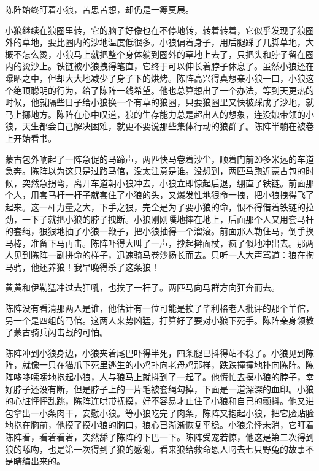 \par 陈阵始终盯着小狼，苦思苦想，却仍是一筹莫展。
\par 小狼继续在狼圈里转，它的脑子好像也在不停地转，转着转着，它似乎发现了狼圈外的草地，要比圈内的沙地温度低很多。小狼偏着身子，用后腿踩了几脚草地，大概不怎么烫，小狼马上就把整个身体躺到圈外的草地上去了，只把头和脖子留在圈内的烫沙上。铁链被小狼拽得笔直，它终于可以伸长着脖子休息了。虽然小狼还在曝晒之中，但却大大地减少了身子下的烘烤。陈阵高兴得真想亲小狼一口，小狼这个绝顶聪明的行为，给了陈阵一线希望。他也总算想出了一个办法，等到天更热的时候，他就隔些日子给小狼换一个有草的狼圈，只要狼圈里又快被踩成了沙地，就马上挪地方。陈阵在心中叹道，狼的生存能力总是超出人的想象，连没娘带领的小狼，天生都会自己解决困难，就更不要说那些集体行动的狼群了。陈阵半躺在被卷上开始看书。
\par 
\par 蒙古包外响起了一阵急促的马蹄声，两匹快马卷着沙尘，顺着门前20多米远的车道急奔。陈阵以为这只是过路马倌，没太注意是谁。没想到，两匹马跑近蒙古包的时候，突然急拐弯，离开车道朝小狼冲去，小狼立即惊起后退，绷直了铁链。前面那个人，用套马杆一杆子就套住了小狼的头，又爆发性地狠命一拽，把小狼拽得飞了起来。这一杆力量之大，下手之狠，完全是为了要小狼的命，恨不得借着铁链的拉劲，一下子就把小狼的脖子拽断。小狼刚刚噗地摔在地上，后面那个人又用套马杆的套绳，狠狠地抽了小狼一鞭子，把小狼抽得一个溜滚。前面那人勒住马，倒手换马棒，准备下马再击。陈阵吓得大叫了一声，抄起擀面杖，疯了似地冲出去。那两人见到陈阵一副拼命的样子，迅速骑马卷沙扬长而去。只听一人大声骂道：狼在掏马驹，他还养狼！我早晚得杀了这条狼！
\par 黄黄和伊勒猛冲过去狂吼，也挨了一杆子。两匹马向马群方向狂奔而去。
\par 陈阵没有看清那两人是谁，他估计有一位可能是挨了毕利格老人批评的那个羊倌，另一个是四组的马倌。这两人来势凶猛，打算好了要对小狼下死手。陈阵亲身领教了蒙古骑兵闪击战的可怕。
\par 陈阵冲到小狼身边，小狼夹着尾巴吓得半死，四条腿已抖得站不稳了。小狼见到陈阵，就像一只在猫爪下死里逃生的小鸡扑向老母鸡那样，跌跌撞撞地扑向陈阵。陈阵哆哆嗦嗦地抱起小狼，人与狼马上就抖到了一起了。他慌忙去摸小狼的脖子，幸好脖子还没有断，但是脖子上的一片毛被套绳勾掉，下面是一道深深的血印。小狼的心脏怦怦乱跳，陈阵连哄带抚摸，好不容易才止住了小狼和自己的颤抖。他又进包拿出一小条肉干，安慰小狼。等小狼吃完了肉条，陈阵又抱起小狼，把它脸贴脸地抱在胸前，他摸了摸小狼的胸口，狼心已渐渐恢复平稳。小狼余悸未消，它盯着陈阵看，看着看着，突然舔了陈阵的下巴一下。陈阵受宠若惊，他这是第二次得到狼的舔吻，也是第一次得到了狼的感谢。看来狼给救命恩人叼去七只野兔的故事不是瞎编出来的。
